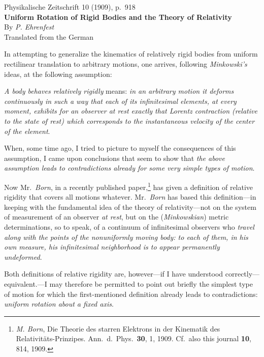 \documentclass[12pt,a4paper]{article}
\newcommand{\opage}[1]{\marginnote{\footnotesize\textit{[#1]}}}
\begin{document}
\thispagestyle{plain}
\begin{center}
{\small Physikalische Zeitschrift 10 (1909), p.~918}\\[1.5em]
{\Large\bfseries Uniform Rotation of Rigid Bodies and the Theory of Relativity}\\[1em]
{\large By \emph{P. Ehrenfest}}\\[1em]
{\small Translated from the German}
\end{center}
\bigskip

\opage{918}In attempting to generalize the kinematics of relatively rigid bodies from uniform rectilinear translation to arbitrary motions, one arrives, following \emph{Minkowski's} ideas, at the following assumption:

\emph{A body behaves relatively rigidly} means: \emph{in an arbitrary motion it deforms continuously in such a way that each of its infinitesimal elements, at every moment, exhibits for an observer at rest exactly that Lorentz contraction (relative to the state of rest) which corresponds to the instantaneous velocity of the center of the element}.

When, some time ago, I tried to picture to myself the consequences of this assumption, I came upon conclusions that seem to show that \emph{the above assumption leads to contradictions already for some very simple types of motion}.

Now Mr.~\emph{Born}, in a recently published paper,\footnote[1]{\emph{M. Born}, Die Theorie des starren Elektrons in der Kinematik des Relativitäts-Prinzipes. Ann.\ d.\ Phys.\ \textbf{30}, 1, 1909. Cf.\ also this journal \textbf{10}, 814, 1909.} has given a definition of relative rigidity that covers all motions whatever. Mr.~\emph{Born} has based this definition---in keeping with the fundamental idea of the theory of relativity---not on the system of measurement of an observer \emph{at rest}, but on the (\emph{Minkowskian}) metric determinations, so to speak, of a continuum of infinitesimal observers who \emph{travel along with the points of the nonuniformly moving body: to each of them, in his own measure, his infinitesimal neighborhood is to appear permanently undeformed}.

Both definitions of relative rigidity are, however---if I have understood correctly---equivalent.---I may therefore be permitted to point out briefly the simplest type of motion for which the first-mentioned definition already leads to contradictions: \emph{uniform rotation about a fixed axis}.
\end{document}
